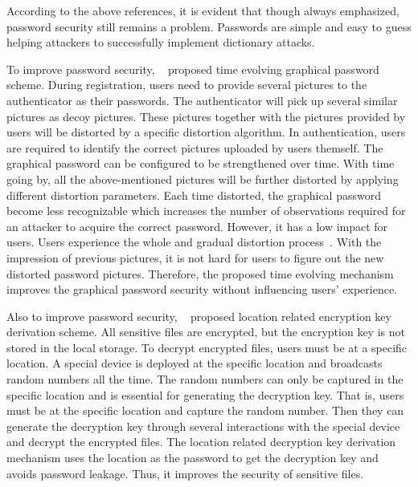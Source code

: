 According to the above references, it is evident that though always emphasized, password security still remains a problem. Passwords are simple and easy to guess helping attackers to successfully implement dictionary attacks. 


To improve password security, ~\cite{Yu2017EvoPass} proposed time evolving graphical password scheme. During registration, users need to provide several pictures to the authenticator as their passwords. The authenticator will pick up several similar pictures as decoy pictures. These pictures together with the pictures provided by users will be distorted by a specific distortion algorithm. In authentication, users are required to identify the correct pictures uploaded by users themself. The graphical password can be configured to be strengthened over time. With time going by, all the above-mentioned pictures will be further distorted by applying different distortion parameters. Each time distorted, the graphical password become less recognizable which increases the number of observations required for an attacker to acquire the correct password. However, it has a low impact for users. Users experience the whole and gradual distortion process~\cite{Davis2004On}. With the impression of previous pictures, it is not hard for users to figure out the new distorted password pictures. Therefore, the proposed time evolving mechanism improves the graphical password security without influencing users’ experience. 


Also to improve password security, ~\cite{Ryu2017Location} proposed location related encryption key derivation scheme. All sensitive files are encrypted, but the encryption key is not stored in the local storage. To decrypt encrypted files, users must be at a specific location. A special device is deployed at the specific location and broadcasts random numbers all the time. The random numbers can only be captured in the specific location and is essential for generating the decryption key. That is, users must be at the specific location and capture the random number. Then they can generate the decryption key through several interactions with the special device and decrypt the encrypted files. The location related decryption key derivation mechanism uses the location as the password to get the decryption key and avoids password leakage. Thus, it improves the security of sensitive files. 
